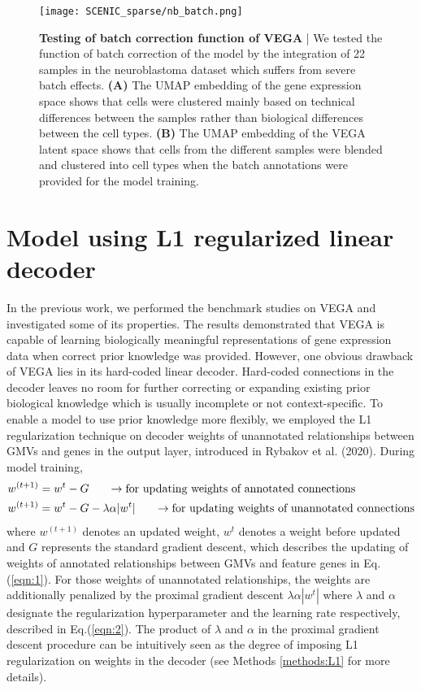 \begin{figure}[h!]
    \centering
    \texttt{[image: SCENIC\_sparse/nb\_batch.png]}
    \caption{\small{\textbf{Testing of batch correction function of VEGA} | We tested the function of batch correction of the model by the integration of 22 samples in the neuroblastoma dataset which suffers from severe batch effects. \textbf{(A)} The UMAP embedding of the gene expression space shows that cells were clustered mainly based on technical differences between the samples rather than biological differences between the cell types. \textbf{(B)} The UMAP embedding of the VEGA latent space shows that cells from the different samples were blended and clustered into cell types when the batch annotations were provided for the model training.}}
    \label{fig:sparse_nb_batch}
\end{figure}

\section{Model using L1 regularized linear decoder}\label{results:regularized_decoder}
In the previous work, we performed the benchmark studies on VEGA\cite{Seninge2021} and investigated some of its properties. The results demonstrated that VEGA is capable of learning biologically meaningful representations of gene expression data when correct prior knowledge was provided. However, one obvious drawback of VEGA lies in its hard-coded linear decoder. Hard-coded connections in the decoder leaves no room for further correcting or expanding existing prior biological knowledge which is usually incomplete or not context-specific\cite{Seninge2021}. To enable a model to use prior knowledge more flexibly, we employed the L1 regularization technique\cite{Ng2004} on decoder weights of unannotated relationships between GMVs and genes in the output layer, introduced in Rybakov et al. (2020). During model training,
\begin{align}
    w^{(t+1)} &= w^t - G \;\;\;\;\;\; \to \textnormal{for updating weights of annotated connections}\label{eqn:1} \\
    w^{(t+1)} &= w^t - G - \lambda\alpha|w^t| \;\;\;\;\;\; \to \textnormal{for updating weights of unannotated connections}\label{eqn:2}
\end{align}
where $w^{(t+1)}$ denotes an updated weight, $w^t$ denotes a weight before updated and $G$ represents the standard gradient descent, which describes the updating of weights of annotated relationships between GMVs and feature genes in Eq.(\ref{eqn:1}). For those weights of unannotated relationships, the weights are additionally penalized by the proximal gradient descent $\lambda\alpha|w^t|$ where $\lambda$ and $\alpha$ designate the regularization hyperparameter and the learning rate respectively, described in Eq.(\ref{eqn:2}). The product of $\lambda$ and $\alpha$ in the proximal gradient descent procedure\cite{Parikh2014} can be intuitively seen as the degree of imposing L1 regularization on weights in the decoder (see Methods \ref{methods:L1} for more details).

